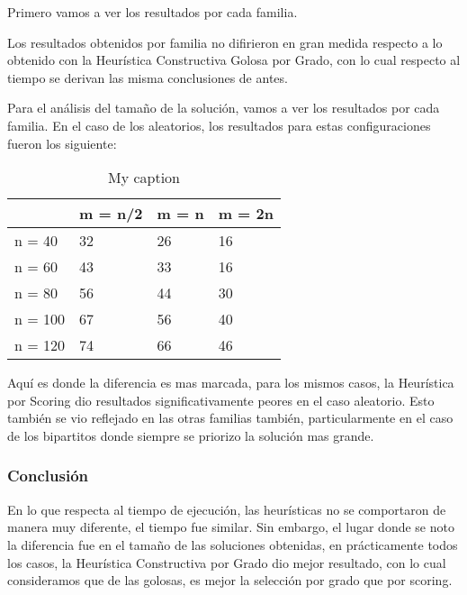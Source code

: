\newpage
Primero vamos a ver los resultados por cada familia.

Los resultados obtenidos por familia no difirieron en gran medida respecto a lo obtenido con la Heurística Constructiva Golosa por Grado, con lo cual respecto al tiempo se derivan las misma conclusiones de antes.

Para el análisis del tamaño de la solución, vamos a ver los resultados por cada familia. En el caso de los aleatorios, los resultados para estas configuraciones fueron los siguiente:

\begin{table}[]
\centering
\caption{My caption}
\label{my-label}
\begin{tabular}{|l|lll|}
\hline
        & \multicolumn{1}{l|}{m = n/2} & \multicolumn{1}{l|}{m = n} & m = 2n \\ \hline
n = 40  & 32                           & 26                         & 16     \\ \cline{1-1}
n = 60  & 43                           & 33                         & 16     \\ \cline{1-1}
n = 80  & 56                           & 44                         & 30     \\ \cline{1-1}
n = 100 & 67                           & 56                         & 40     \\ \cline{1-1}
n = 120 & 74                           & 66                         & 46     \\ \hline
\end{tabular}
\end{table}

Aquí es donde la diferencia es mas marcada, para los mismos casos, la Heurística por Scoring dio resultados significativamente peores en el caso aleatorio. Esto también se vio reflejado en las otras familias también, particularmente en el caso de los bipartitos donde siempre se priorizo la solución mas grande.

\subsubsection{Conclusión}

En lo que respecta al tiempo de ejecución, las heurísticas no se comportaron de manera muy diferente, el tiempo fue similar. Sin embargo, el lugar donde se noto la diferencia fue en el tamaño de las soluciones obtenidas, en prácticamente todos los casos, la Heurística Constructiva por Grado dio mejor resultado, con lo cual consideramos que de las golosas, es mejor la selección por grado que por scoring.